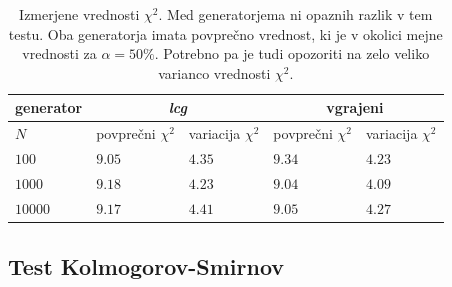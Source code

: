 \documentclass[slovene,11pt,a4paper]{article}
\numberwithin{equation}{section} %
\numberwithin{figure}{section} %
\numberwithin{table}{section} %
\begin{document}
\begin{table}[!h]
\begin{center}
\begin{tabular}{|l|l|l|l|l|}
\hline
generator & \multicolumn{2}{c|}{\textit{lcg}} &  \multicolumn{2}{c|}{vgrajeni}  \\ \hline
$N$ & povprečni $\chi^2$ & variacija $\chi^2$ & povprečni $\chi^2$ & variacija $\chi^2$ \\  \hline
$100$ & $9.05$ & $4.35$ & $9.34$ & $4.23$ \\ \hline
$1000$ & $9.18$ & $4.23$ & $9.04$ & $4.09$ \\ \hline
$10000$ & $9.17$ & $4.41$ & $9.05$ & $4.27$ \\ \hline
\end{tabular}
\end{center}
\caption{Izmerjene vrednosti $\chi^2$. Med generatorjema ni opaznih razlik v tem testu. Oba generatorja imata povprečno vrednost, ki je v okolici mejne vrednosti za $\alpha=50\%$. Potrebno pa je tudi opozoriti na zelo veliko varianco vrednosti $\chi^2$. }
\end{table}

\newpage
\subsection{Test Kolmogorov-Smirnov}
\end{document}
